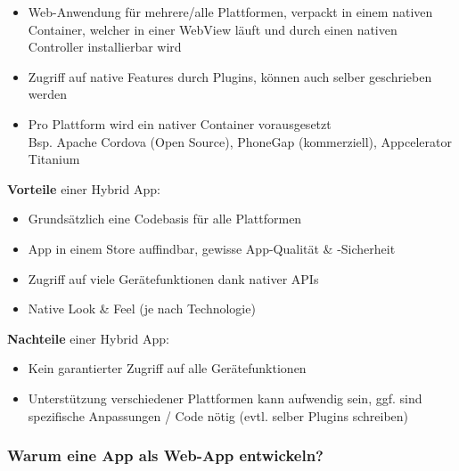 \documentclass[a4paper]{article}
\begin{document}
		\begin{itemize}
			
			\item Web-Anwendung für mehrere/alle Plattformen, verpackt in einem nativen Container, welcher in einer WebView läuft und durch einen nativen Controller installierbar wird
			
			\item Zugriff auf native Features durch Plugins, können auch selber geschrieben werden
			
			\item Pro Plattform wird ein nativer Container vorausgesetzt\\
					Bsp. Apache Cordova (Open Source), PhoneGap (kommerziell), Appcelerator Titanium
			
		\end{itemize}
		\vspace{1em}
		\textbf{Vorteile} einer Hybrid App:
		\begin{itemize}
			
			\item Grundsätzlich eine Codebasis für alle Plattformen
			
			\item App in einem Store auffindbar, gewisse App-Qualität \& -Sicherheit
			
			\item Zugriff auf viele Gerätefunktionen dank nativer APIs
			
			\item Native Look \& Feel (je nach Technologie)
			
		\end{itemize}
		\vspace{1em}
		\textbf{Nachteile} einer Hybrid App:
		\begin{itemize}
			
			\item Kein garantierter Zugriff auf alle Gerätefunktionen
			
			\item Unterstützung verschiedener Plattformen kann aufwendig sein, ggf. sind spezifische Anpassungen / Code nötig (evtl. selber Plugins schreiben)
			
		\end{itemize}
	
		\newpage
	
		\subsubsection{Warum eine App als Web-App entwickeln?}
	
\end{document}
